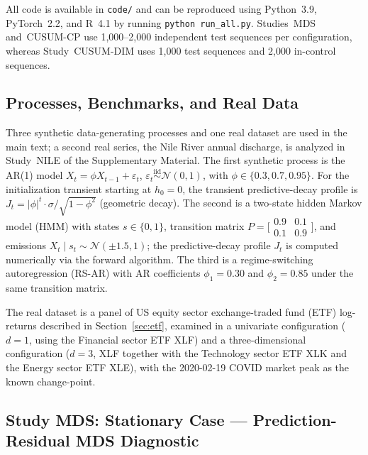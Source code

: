 \documentclass[bj,authoryear]{imsart}
\theoremstyle{plain}
\theoremstyle{definition}
\newcommand{\given}{\mid}
\newcommand{\iid}{\overset{\mathrm{iid}}{\sim}}
\begin{document}
All code is available in \texttt{code/} and can be reproduced using
Python~3.9, PyTorch~2.2, and R~4.1 by running
\texttt{python run\_all.py}. Studies~MDS and~CUSUM-CP use
1,000--2,000 independent test sequences per configuration, whereas
Study~CUSUM-DIM uses 1,000 test sequences and 2,000 in-control sequences.


\subsection{Processes, Benchmarks, and Real Data}
\label{sec:processes}

Three synthetic data-generating processes and one real dataset are used in
the main text; a second real series, the Nile River annual discharge, is
analyzed in Study~NILE of the Supplementary Material.
The first synthetic process is the AR(1) model $X_t = \phi X_{t-1} + \varepsilon_t$,
$\varepsilon_t \iid \mathcal{N}(0,1)$, with $\phi \in \{0.3, 0.7, 0.95\}$.
For the initialization transient starting at $h_0 = 0$,
the transient predictive-decay profile is
$J_t = |\phi|^t \cdot \sigma/\sqrt{1-\phi^2}$ (geometric decay).
%
The second is a two-state hidden Markov model (HMM) with states $s\in\{0,1\}$,
transition matrix
$P=\bigl[\begin{smallmatrix}0.9&0.1\\0.1&0.9\end{smallmatrix}\bigr]$,
and emissions $X_t\given s_t \sim \mathcal{N}(\pm 1.5, 1)$;
the predictive-decay profile $J_t$ is computed numerically via the forward algorithm.
The third is a regime-switching autoregression (RS-AR) with AR coefficients
$\phi_1 = 0.30$ and $\phi_2 = 0.85$ under the same transition matrix.

The real dataset is a panel of US equity sector exchange-traded fund
(ETF) log-returns described in Section~\ref{sec:etf}, examined in a univariate
configuration ($d=1$, using the Financial sector ETF XLF) and a three-dimensional
configuration ($d=3$, XLF together with the Technology sector ETF XLK and the
Energy sector ETF XLE), with the 2020-02-19 COVID market peak as the known
change-point.

\subsection{Study MDS: Stationary Case --- Prediction-Residual MDS Diagnostic}
\label{sec:mds}
\end{document}
